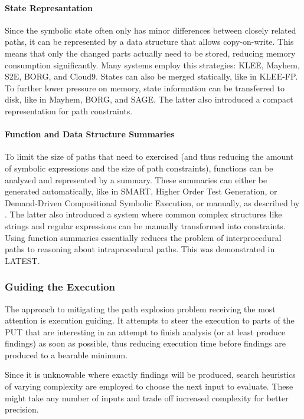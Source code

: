 \documentclass{article}
\begin{document}
\begin{multicols}{2}
  \paragraph{State Represantation} Since the symbolic state often only has minor differences between closely related paths, it can be represented by a data structure that allows copy-on-write. This means that only the changed parts actually need to be stored, reducing memory consumption significantly. Many systems employ this strategies: KLEE\cite{KLEE}, Mayhem\cite{Mayhem}, S2E\cite{S2E}, BORG\cite{BORG}, and Cloud9\cite{Cloud9}. States can also be merged statically, like in KLEE-FP\cite{KLEEFP}. To further lower pressure on memory, state information can be transferred to disk, like in Mayhem\cite{Mayhem}, BORG\cite{BORG}, and SAGE\cite{SAGE}. The latter also introduced a compact representation for path constraints.\cite{SAGE}

  \paragraph{Function and Data Structure Summaries} To limit the size of paths that need to exercised (and thus reducing the amount of symbolic expressions and the size of path constraints), functions can be analyzed and represented by a summary. These summaries can either be generated automatically, like in SMART\cite{SMART}, Higher Order Test Generation\cite{HigherOrderTestGeneration}, or Demand-Driven Compositional Symbolic Execution\cite{DDCSE}, or manually, as described by \citeauthor{PFA}\cite{PFA}. The latter also introduced a system where common complex structures like strings and regular expressions can be manually transformed into constraints.\cite{PFA} Using function summaries essentially reduces the problem of interprocedural paths to reasoning about intraprocedural paths. This was demonstrated in LATEST\cite{LATEST}.

  \subsubsection{Guiding the Execution}
  The approach to mitigating the path explosion problem receiving the most attention is execution guiding. It attempts to steer the execution to parts of the PUT that are interesting in an attempt to finish analysis (or at least produce findings) as soon as possible, thus reducing execution time before findings are produced to a bearable minimum.

  Since it is unknowable where exactly findings will be produced, search heuristics of varying complexity are employed to choose the next input to evaluate. These might take any number of inputs and trade off increased complexity for better precision.


\end{multicols}
\end{document}

